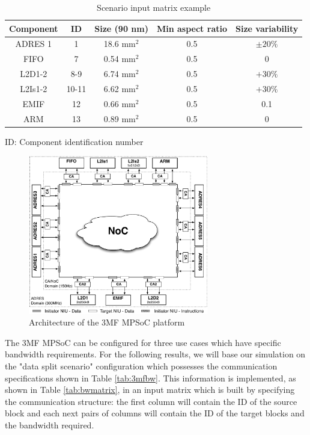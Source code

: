 \begin{table}[h!]
\caption{Scenario input matrix example}
\begin{center}
\begin{tabular}{|c|c|c|c|c|}
\hline Component & ID & Size (90 nm) & Min aspect ratio & Size variability\\
\hline ADRES 1\texttildelow 6 & 1\texttildelow 6 & 18.6 mm$^2$ & 0.5 & $\pm20\%$\\
FIFO & 7 & 0.54 mm$^2$ & 0.5 & 0\\
L2D1-2 & 8-9 & 6.74 mm$^2$ & 0.5 & $+30\%$\\
L2Is1-2 & 10-11 & 6.62 mm$^2$ & 0.5 & $+30\%$\\
EMIF & 12 & 0.66 mm$^2$ & 0.5 & 0.1\\
ARM & 13 & 0.89 mm$^2$ & 0.5 & 0\\
\hline
\end{tabular}
\end{center}
\begin{center}
{\small ID: Component identification number}
\end{center}
\label{tab:scenarmat}
\end{table}

\begin{figure}[h!]
\begin{center}
\includegraphics[width=0.7\textwidth]{3MFMPSoC.pdf}
\end{center}
\vspace{-0.3cm}
\caption{Architecture of the 3MF MPSoC platform~\cite{dmilojev08b}}
\label{fig:imec3mf}
\end{figure}

The 3MF MPSoC can be configured for three use cases which have specific bandwidth requirements. For the following results, we will base our simulation on the "data split scenario" configuration which possesses the communication specifications shown in Table \ref{tab:3mfbw}. This information is implemented, as shown in Table \ref{tab:bwmatrix}, in an input matrix which is built by specifying the communication structure: the first column will contain the ID of the source block and each next pairs of columns will contain the ID of the target blocks and the bandwidth required.

